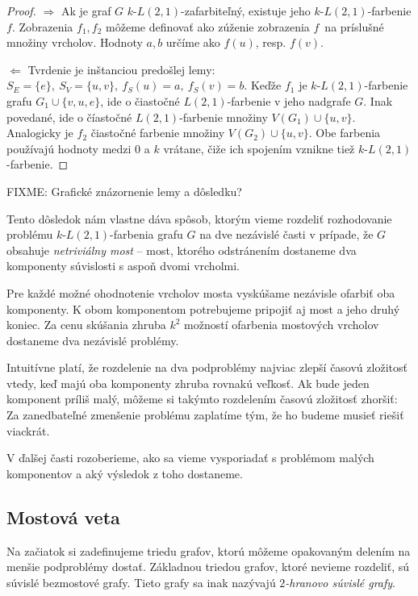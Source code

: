 \begin{proof}
    $\boxed{\Rightarrow}$
        Ak je graf $G$ $k$-$L(2,1)$-zafarbiteľný, existuje jeho $k$-$L(2,1)$-farbenie $f$. Zobrazenia $f_1, f_2$ môžeme
        definovať ako zúženie zobrazenia $f$ na príslušné množiny vrcholov. Hodnoty $a, b$ určíme ako $f(u)$, resp. $f(v)$.

    $\boxed{\Leftarrow}$
        Tvrdenie je inštanciou predošlej lemy: $S_E = \{e\},\ S_V = \{u,v\},\ f_S(u) = a,\ f_S(v) = b$. Keďže $f_1$
        je $k$-$L(2,1)$-farbenie grafu $G_1 \cup \{v, u, e\}$, ide o čiastočné $L(2,1)$-farbenie v jeho nadgrafe $G$.
        Inak povedané, ide o číastočné $L(2,1)$-farbenie množiny $V(G_1) \cup \{u, v\}$. Analogicky je $f_2$ čiastočné
        farbenie množiny $V(G_2) \cup \{u,v\}$. Obe farbenia používajú hodnoty medzi $0$ a $k$ vrátane, čiže ich
        spojením vznikne tiež $k$-$L(2,1)$-farbenie.
\end{proof}

FIXME: Grafické znázornenie lemy a dôsledku? %

Tento dôsledok nám vlastne dáva spôsob, ktorým vieme rozdeliť rozhodovanie
problému $k$-$L(2,1)$-farbenia grafu $G$ na dve nezávislé časti v prípade,
že $G$ obsahuje \emph{netriviálny most} -- most, ktorého odstránením dostaneme
dva komponenty súvislosti s aspoň dvomi vrcholmi.

Pre každé možné ohodnotenie vrcholov mosta vyskúšame nezávisle ofarbiť oba
komponenty. K obom komponentom potrebujeme pripojiť aj most a jeho druhý koniec. Za cenu
skúšania zhruba $k^2$ možností ofarbenia mostových vrcholov dostaneme dva nezávislé
problémy.

Intuitívne platí, že rozdelenie na dva podproblémy
najviac zlepší časovú zložitosť vtedy, keď majú oba komponenty zhruba rovnakú veľkosť.
Ak bude jeden komponent príliš malý, môžeme si takýmto rozdelením časovú zložitosť zhoršiť:
Za zanedbateľné zmenšenie problému zaplatíme tým, že ho budeme musieť riešiť viackrát.

V ďalšej časti rozoberieme, ako sa vieme vysporiadať s problémom malých komponentov a
aký výsledok z toho dostaneme.

\subsection{Mostová veta}

Na začiatok si zadefinujeme triedu grafov, ktorú môžeme opakovaným delením na menšie
podproblémy dostať. Základnou triedou grafov, ktoré nevieme rozdeliť, sú súvislé
bezmostové grafy. Tieto grafy sa inak nazývajú \emph{$2$-hranovo súvislé grafy}.

